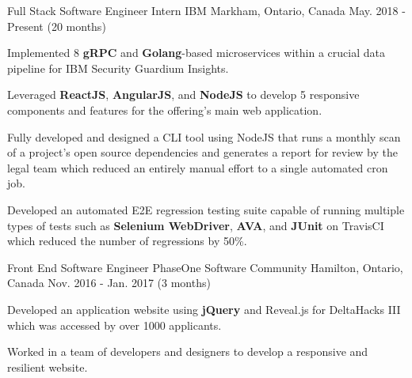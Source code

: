 


\begin{cventries}


\cventry
{Full Stack Software Engineer Intern} %
{IBM} %
{Markham, Ontario, Canada} %
{May. 2018 - Present (20 months)} %
{ %
\begin{cvitems}
\item {Implemented 8 \textbf{gRPC} and \textbf{Golang}-based microservices within a crucial data pipeline for IBM Security Guardium Insights.}
\item {Leveraged \textbf{ReactJS}, \textbf{AngularJS}, and \textbf{NodeJS} to develop 5 responsive components and features for the offering's main web application.}
\item {Fully developed and designed a CLI tool using NodeJS that runs a monthly scan of a project's open source dependencies and generates a report for review by the legal team which reduced an entirely manual effort to a single automated cron job.}
\item {Developed an automated E2E regression testing suite capable of running multiple types of tests such as \textbf{Selenium WebDriver}, \textbf{AVA}, and \textbf{JUnit} on TravisCI which reduced the number of regressions by 50\%.}
\end{cvitems}
}


\cventry
{Front End Software Engineer} %
{PhaseOne Software Community} %
{Hamilton, Ontario, Canada} %
{Nov. 2016 - Jan. 2017 (3 months)} %
{ %
\begin{cvitems}
\item {Developed an application website using \textbf{jQuery} and Reveal.js for DeltaHacks III which was accessed by over 1000 applicants.}
\item {Worked in a team of developers and designers to develop a responsive and resilient website.}
\end{cvitems}
}


\end{cventries}